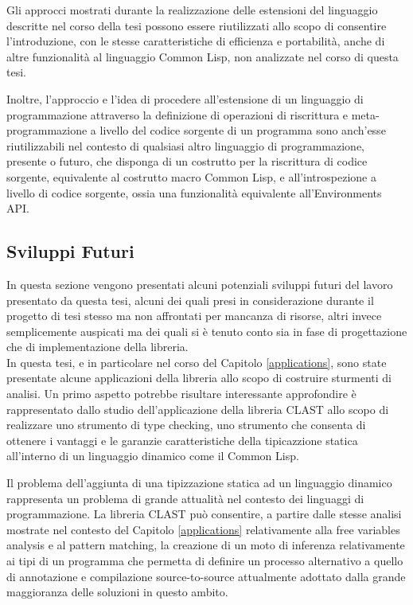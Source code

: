 \documentclass{book}
\begin{document}
Gli approcci mostrati durante la realizzazione delle estensioni del linguaggio
descritte nel corso della tesi possono essere riutilizzati allo scopo di
consentire l'introduzione, con le stesse caratteristiche di efficienza e
portabilità, anche di altre funzionalità al linguaggio Common Lisp, non
analizzate nel corso di questa tesi.

Inoltre, l'approccio e l'idea di procedere all'estensione di un linguaggio di
programmazione attraverso la definizione di operazioni di riscrittura e
meta-programmazione a livello del codice sorgente di un programma sono anch'esse
riutilizzabili nel contesto di qualsiasi altro linguaggio di programmazione,
presente o futuro, che disponga di un costrutto per la riscrittura di codice
sorgente, equivalente al costrutto macro Common Lisp, e all'introspezione a
livello di codice sorgente, ossia una funzionalità equivalente all'Environments
API.

\subsection{Sviluppi Futuri}

In questa sezione vengono presentati alcuni potenziali sviluppi futuri del
lavoro presentato da questa tesi, alcuni dei quali presi in considerazione
durante il progetto di tesi stesso ma non affrontati per mancanza di risorse,
altri invece semplicemente auspicati ma dei quali si è tenuto conto sia in fase
di progettazione che di implementazione della libreria.\\

In questa tesi, e in particolare nel corso del Capitolo \ref{applications}, sono
state presentate alcune applicazioni della libreria allo scopo di costruire
sturmenti di analisi. Un primo aspetto potrebbe risultare interessante
approfondire è rappresentato dallo studio dell'applicazione della libreria CLAST
allo scopo di realizzare uno strumento di type checking, uno strumento che
consenta di ottenere i vantaggi e le garanzie caratteristiche della tipicazzione
statica all'interno di un linguaggio dinamico come il Common Lisp.

Il problema dell'aggiunta di una tipizzazione statica ad un linguaggio dinamico
rappresenta un problema di grande attualità nel contesto dei linguaggi di
programmazione. La libreria CLAST può consentire, a partire dalle stesse analisi
mostrate nel contesto del Capitolo \ref{applications} relativamente alla free
variables analysis e al pattern matching, la creazione di un moto di inferenza
relativamente ai tipi di un programma che permetta di definire un processo
alternativo a quello di annotazione e compilazione source-to-source attualmente
adottato dalla grande maggioranza delle soluzioni in questo ambito.\\
\end{document}
